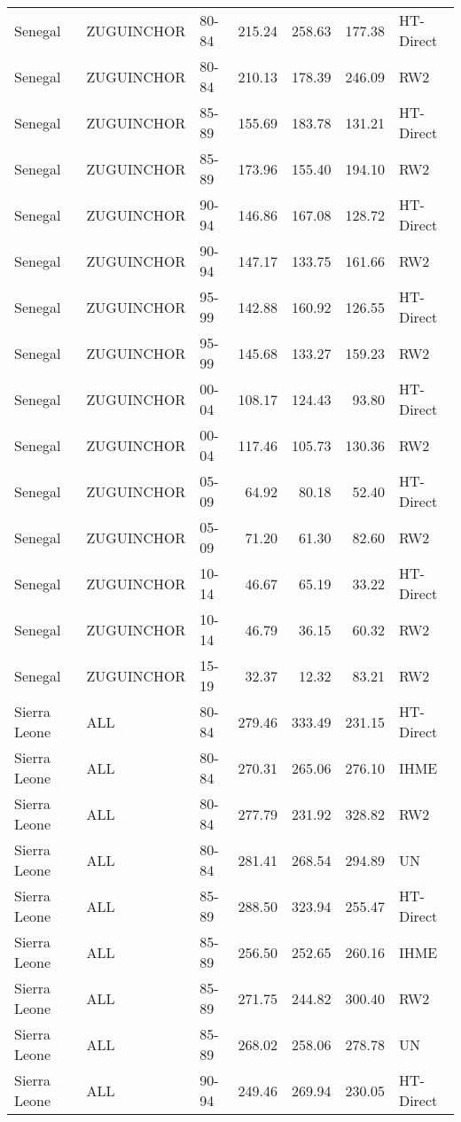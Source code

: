 \begin{longtable}{lllrrrl}
  Senegal & ZUGUINCHOR & 80-84 & 215.24 & 258.63 & 177.38 & HT-Direct \\ 
  Senegal & ZUGUINCHOR & 80-84 & 210.13 & 178.39 & 246.09 & RW2 \\ 
  Senegal & ZUGUINCHOR & 85-89 & 155.69 & 183.78 & 131.21 & HT-Direct \\ 
  Senegal & ZUGUINCHOR & 85-89 & 173.96 & 155.40 & 194.10 & RW2 \\ 
  Senegal & ZUGUINCHOR & 90-94 & 146.86 & 167.08 & 128.72 & HT-Direct \\ 
  Senegal & ZUGUINCHOR & 90-94 & 147.17 & 133.75 & 161.66 & RW2 \\ 
  Senegal & ZUGUINCHOR & 95-99 & 142.88 & 160.92 & 126.55 & HT-Direct \\ 
  Senegal & ZUGUINCHOR & 95-99 & 145.68 & 133.27 & 159.23 & RW2 \\ 
  Senegal & ZUGUINCHOR & 00-04 & 108.17 & 124.43 & 93.80 & HT-Direct \\ 
  Senegal & ZUGUINCHOR & 00-04 & 117.46 & 105.73 & 130.36 & RW2 \\ 
  Senegal & ZUGUINCHOR & 05-09 & 64.92 & 80.18 & 52.40 & HT-Direct \\ 
  Senegal & ZUGUINCHOR & 05-09 & 71.20 & 61.30 & 82.60 & RW2 \\ 
  Senegal & ZUGUINCHOR & 10-14 & 46.67 & 65.19 & 33.22 & HT-Direct \\ 
  Senegal & ZUGUINCHOR & 10-14 & 46.79 & 36.15 & 60.32 & RW2 \\ 
  Senegal & ZUGUINCHOR & 15-19 & 32.37 & 12.32 & 83.21 & RW2 \\ 
  Sierra Leone & ALL & 80-84 & 279.46 & 333.49 & 231.15 & HT-Direct \\ 
  Sierra Leone & ALL & 80-84 & 270.31 & 265.06 & 276.10 & IHME \\ 
  Sierra Leone & ALL & 80-84 & 277.79 & 231.92 & 328.82 & RW2 \\ 
  Sierra Leone & ALL & 80-84 & 281.41 & 268.54 & 294.89 & UN \\ 
  Sierra Leone & ALL & 85-89 & 288.50 & 323.94 & 255.47 & HT-Direct \\ 
  Sierra Leone & ALL & 85-89 & 256.50 & 252.65 & 260.16 & IHME \\ 
  Sierra Leone & ALL & 85-89 & 271.75 & 244.82 & 300.40 & RW2 \\ 
  Sierra Leone & ALL & 85-89 & 268.02 & 258.06 & 278.78 & UN \\ 
  Sierra Leone & ALL & 90-94 & 249.46 & 269.94 & 230.05 & HT-Direct \\ 

\end{longtable}
